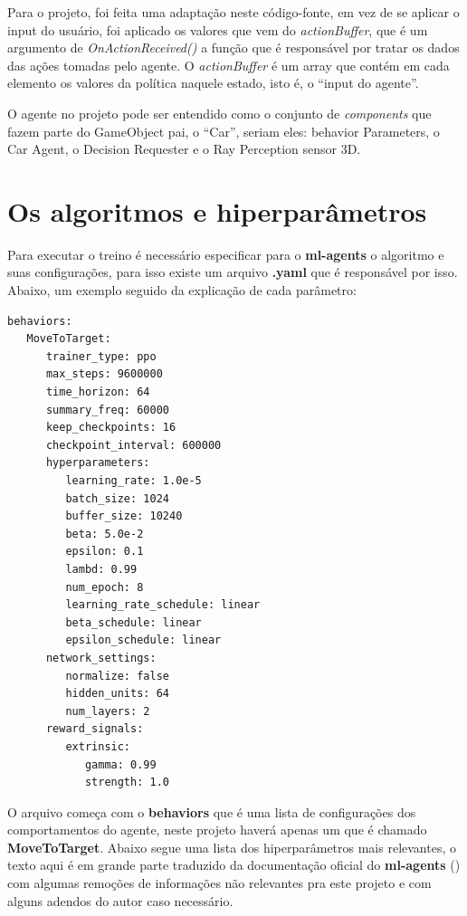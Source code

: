 Para o projeto, foi feita uma adaptação neste código-fonte, em vez de se aplicar o input do usuário, foi aplicado os valores que vem do \textit{actionBuffer}, que é um argumento de \textit{OnActionReceived()} a função que é responsável por tratar os dados das ações tomadas pelo agente. O \textit{actionBuffer} é um array que contém em cada elemento os valores da política naquele estado, isto é, o ``input do agente''.

O agente no projeto pode ser entendido como o conjunto de \textit{components} que fazem parte do GameObject pai, o ``Car'', seriam eles: behavior Parameters, o Car Agent, o Decision Requester e o Ray Perception sensor 3D. 

\section{Os algoritmos e hiperparâmetros}\label{algoritmos}
Para executar o treino é necessário especificar para o \textbf{ml-agents} o algoritmo e suas configurações, para isso existe um arquivo \textbf{.yaml} que é responsável por isso. Abaixo, um exemplo seguido da explicação de cada parâmetro:

\begin{lstlisting}
behaviors:
   MoveToTarget:
      trainer_type: ppo
      max_steps: 9600000
      time_horizon: 64
      summary_freq: 60000
      keep_checkpoints: 16     
      checkpoint_interval: 600000
      hyperparameters:
         learning_rate: 1.0e-5
         batch_size: 1024
         buffer_size: 10240
         beta: 5.0e-2
         epsilon: 0.1
         lambd: 0.99
         num_epoch: 8
         learning_rate_schedule: linear
         beta_schedule: linear
         epsilon_schedule: linear
      network_settings:
         normalize: false
         hidden_units: 64
         num_layers: 2
      reward_signals:
         extrinsic:
            gamma: 0.99
            strength: 1.0
\end{lstlisting}

O arquivo começa com o \textbf{behaviors} que é uma lista de configurações dos comportamentos do agente, neste projeto haverá apenas um que é chamado \textbf{MoveToTarget}. Abaixo segue uma lista dos hiperparâmetros mais relevantes, o texto aqui é em grande parte traduzido da documentação oficial do \textbf{ml-agents} () com algumas remoções de informações não relevantes pra este projeto e com alguns adendos do autor caso necessário.

